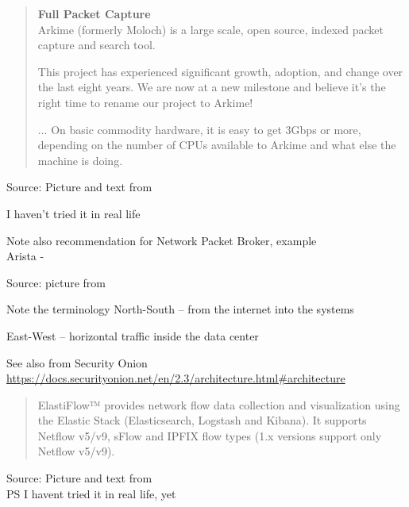 \documentclass[Screen16to9,17pt]{foils}
\begin{document}
\begin{quote}\small
{\bf Full Packet Capture}\\
Arkime (formerly Moloch) is a large scale, open source, indexed packet capture and search tool.

This project has experienced significant growth, adoption, and change over the last eight years. We are now at a new milestone and believe it’s the right time to rename our project to Arkime!

...
On basic commodity hardware, it is easy to get 3Gbps or more, depending on the number of CPUs available to Arkime and what else the machine is doing.
\end{quote}
Source: Picture and text from 

\begin{list2}
\item I haven't tried it in real life
\item Note also recommendation for Network Packet Broker, example\\
Arista - 
\end{list2}





Source: picture from 

\begin{list2}
\item Note the terminology North-South -- from the internet into the systems
\item East-West -- horizontal traffic inside the data center
\item See also from Security Onion \url{https://docs.securityonion.net/en/2.3/architecture.html#architecture}
\end{list2}





\begin{quote}
  ElastiFlow™ provides network flow data collection and visualization using the Elastic Stack (Elasticsearch, Logstash and Kibana). It supports Netflow v5/v9, sFlow and IPFIX flow types (1.x versions support only Netflow v5/v9).
\end{quote}
Source: Picture and text from  \\
PS I havent tried it in real life, yet
\end{document}
